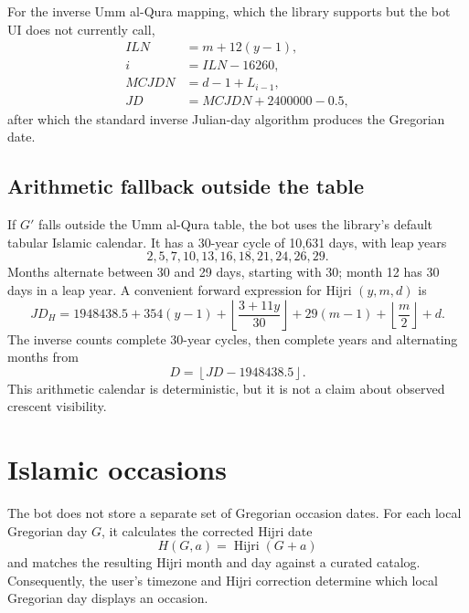 \documentclass[11pt,a4paper]{article}
\begin{document}
For the inverse Umm al-Qura mapping, which the library supports but the bot UI does not currently call,
\begin{align}
 ILN &= m+12(y-1),\\
 i &= ILN-16260,\\
 MCJDN &= d-1+L_{i-1},\\
 JD &= MCJDN+2400000-0.5,
\end{align}
after which the standard inverse Julian-day algorithm produces the Gregorian date.

\subsection{Arithmetic fallback outside the table}

If $G'$ falls outside the Umm al-Qura table, the bot uses the library's default tabular Islamic calendar. It has a 30-year cycle of 10,631 days, with leap years
\[
 2,5,7,10,13,16,18,21,24,26,29.
\]
Months alternate between 30 and 29 days, starting with 30; month 12 has 30 days in a leap year. A convenient forward expression for Hijri $(y,m,d)$ is
\begin{equation}
 JD_H=1948438.5+354(y-1)+
 \left\lfloor\frac{3+11y}{30}\right\rfloor+
 29(m-1)+\left\lfloor\frac{m}{2}\right\rfloor+d.
 \label{eq:hijrijd}
\end{equation}
The inverse counts complete 30-year cycles, then complete years and alternating months from
\begin{equation}
  D=\left\lfloor JD-1948438.5\right\rfloor.
\end{equation}
This arithmetic calendar is deterministic, but it is not a claim about observed crescent visibility.

\section{Islamic occasions}\label{sec:occasions}

The bot does not store a separate set of Gregorian occasion dates. For each local Gregorian day $G$, it calculates the corrected Hijri date
\begin{equation}
  H(G,a)=\operatorname{Hijri}(G+a)
\end{equation}
and matches the resulting Hijri month and day against a curated catalog. Consequently, the user's timezone and Hijri correction determine which local Gregorian day displays an occasion.
\end{document}
